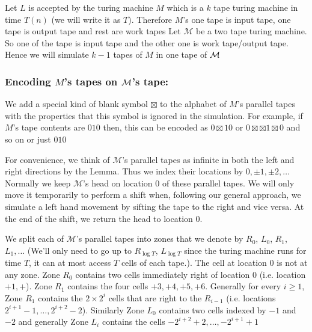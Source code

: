 \documentclass[a4paper, 11pt]{article}
\begin{document}
{		
		Let $L$ is accepted by the turing machine $M$ which is a $k$ tape turing machine in time $T(n)$ (we will write it as $T$). Therefore $M$'s one tape is input tape, one tape is output tape and rest are work tapes Let $\mathcal{M}$ be a  two tape turing machine. So one of the tape is input tape and the other one is work tape/output tape. Hence we will simulate $k-1$ tapes of $M$ in one tape of $\mathcal{M}$
		\subsubsection*{Encoding $M$'s tapes on  $\mathcal{M}$'s tape:}\parinf We add a special kind of blank symbol $\boxtimes$ to the alphabet of $M$’s parallel tapes with the properties that this symbol is ignored in the simulation. For example, if $M$'s tape contents are $010$ then, this can be encoded as $0\boxtimes 10$ or $0\boxtimes\boxtimes1\boxtimes 0$ and so on or just $010$\parinn
		
		For convenience, we think of $\mathcal{M}$'s parallel tapes as infinite in both the left and right directions by the Lemma. Thus we index their locations by $0,\pm 1,\pm 2,\dots$ Normally we keep $\mathcal{M}$'s head on location 0 of these parallel tapes. We will only move it temporarily to perform a shift when, following our general approach, we simulate a left hand movement by sifting the tape to the right and vice versa. At the end of the shift, we return the head to location 0.
		
		
		We split each of $\mathcal{M}$'s parallel tapes into zones that we denote by $R_0$, $L_0$, $R_1$, $L_1,\dots$ (We'll only need to go up to $R_{\log T}$, $L_{\log T}$ since the turing machine runs for time $T$, it can at most access $T$ cells of each tape.). The cell at location 0 is not at any zone. Zone $R_0$ contains two cells immediately right of location 0 (i.e. location $+1,+$). Zone $R_1$ contains the four cells $+3,+4,+5,+6$. Generally for every $i\geq 1$, Zone $R_1$ contains the $2\times 2^i$ cells that are right to the $R_{i-1}$ (i.e. locations $2^{i+1}-1,\dots, 2^{i+2}-2$). Similarly Zone $L_0$ contains two cells indexed by $-1$ and $-2$ and generally  Zone $L_i$ contains the cells $-2^{i+2}+2,\dots,- 2^{i+1}+1$
		
}
\end{document}
